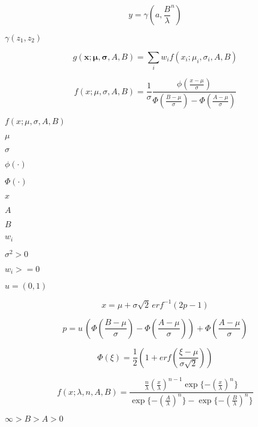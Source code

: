 \documentclass{article}
\begin{document}
\[
        y = \gamma \left( a, \frac{B}{\lambda}^n \right)
    \]
\pagebreak

$ \gamma(z_1, z_2) $
\pagebreak

\[
    g (\mathbf{x}; \mathbf{\mu}, \mathbf{\sigma}, A, B) =
        \sum_i w_i f(x_i; \mu_i, \sigma_i, A, B)
\]
\pagebreak

\[
    f(x; \mu, \sigma, A, B) =
        \frac{1}{\sigma}
        \frac{
            \phi \left( \frac{x - \mu}{\sigma} \right)
        }{
            \Phi \left( \frac{B - \mu}{\sigma} \right)
          - \Phi \left( \frac{A - \mu}{\sigma} \right)
        }
\]
\pagebreak

$      f(x; \mu, \sigma, A, B) $
\pagebreak

$      \mu         $
\pagebreak

$      \sigma      $
\pagebreak

$      \phi(\cdot) $
\pagebreak

$      \Phi(\cdot) $
\pagebreak

$      x           $
\pagebreak

$      A           $
\pagebreak

$      B           $
\pagebreak

$      w_i         $
\pagebreak

$ \sigma^2 > 0 $
\pagebreak

$ w_i >= 0 $
\pagebreak

$u = (0, 1)$
\pagebreak

\[
        x = \mu + \sigma \sqrt{2} \, {erf}^{-1} \left( 2 p - 1 \right)
    \]
\pagebreak

\[
        p = u \,
            \left(
                \Phi\left(
                    \frac{B - \mu}{\sigma}
                    \right)
              - \Phi\left(
                    \frac{A - \mu}{\sigma}
                    \right)
            \right)
          + \Phi\left( \frac{A - \mu}{\sigma} \right)
    \]
\pagebreak

\[
        \Phi(\xi) =
            \frac{1}{2}
            \left(
                1 + {erf}\left(\frac{\xi - \mu}{\sigma \sqrt{2} }\right)
            \right)
    \]
\pagebreak

\[
    f(x; \lambda, n, A, B) =
        \frac{
            \frac{n}{\lambda}
            \left( \frac{x}{\lambda} \right)^{n-1}
            \exp\{ -(\frac{x}{\lambda})^n \}
        }{
            \exp\{- (\frac{A}{\lambda})^n \}
          - \exp\{- (\frac{B}{\lambda})^n \}
        }
\]
\pagebreak

$ \infty > B > A > 0$
\pagebreak
\end{document}
